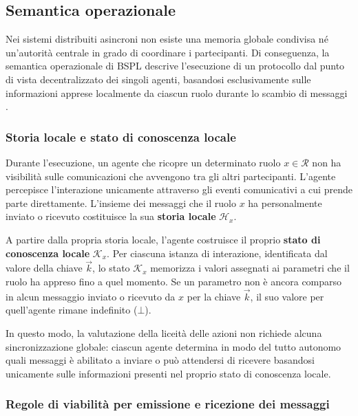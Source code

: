 \subsection{Semantica operazionale}\label{bspl:semantica}

Nei sistemi distribuiti asincroni non esiste una memoria globale condivisa né un'autorità centrale
in grado di coordinare i partecipanti. Di conseguenza, la semantica operazionale di BSPL descrive
l'esecuzione di un protocollo dal punto di vista decentralizzato dei singoli agenti, basandosi
esclusivamente sulle informazioni apprese localmente da ciascun ruolo durante lo scambio di messaggi \autocite{singh2012semantics}.

\subsubsection{Storia locale e stato di conoscenza locale}\label{bspl:stato_locale}

Durante l'esecuzione, un agente che ricopre un determinato ruolo $x \in \mathcal{R}$ non ha visibilità
sulle comunicazioni che avvengono tra gli altri partecipanti. L'agente percepisce l'interazione unicamente
attraverso gli eventi comunicativi a cui prende parte direttamente. L'insieme dei messaggi che il ruolo
$x$ ha personalmente inviato o ricevuto costituisce la sua \textbf{storia locale} $\mathcal{H}_x$.

A partire dalla propria storia locale, l'agente costruisce il proprio \textbf{stato di conoscenza locale}
$\mathcal{K}_x$. Per ciascuna istanza di interazione, identificata dal valore della chiave $\vec{k}$,
lo stato $\mathcal{K}_x$ memorizza i valori assegnati ai parametri che il ruolo ha appreso fino a quel
momento. Se un parametro non è ancora comparso in alcun messaggio inviato o ricevuto da $x$ per la
chiave $\vec{k}$, il suo valore per quell'agente rimane indefinito ($\bot$).

In questo modo, la valutazione della liceità delle azioni non richiede alcuna sincronizzazione globale:
ciascun agente determina in modo del tutto autonomo quali messaggi è abilitato a inviare o può attendersi
di ricevere basandosi unicamente sulle informazioni presenti nel proprio stato di conoscenza locale.

\subsubsection{Regole di viabilità per emissione e ricezione dei messaggi}\label{bspl:viabilita}

